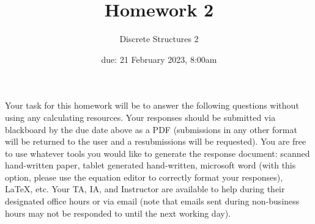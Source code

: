 \documentclass[11pt, oneside]{article}   	%
\title{Homework 2}
\author{Discrete Structures 2}
\date{due: 21 February 2023, 8:00am}							%
\begin{document}
\maketitle

Your task for this homework will be to answer the following questions without using any calculating resources. 
Your responses should be submitted via blackboard by the due date above as a PDF (submissions in any other format will be returned to the user and a resubmissions will be requested). 
You are free to use whatever tools you would like to generate the response document: 
scanned hand-written paper, 
tablet generated hand-written, 
microsoft word (with this option, please use the equation editor to correctly format your responses), 
\LaTeX, etc.
Your TA, IA, and Instructor are available to help during their designated office hours or via email 
(note that emails sent during non-business hours may not be responded to until the next working day). 
\end{document}
